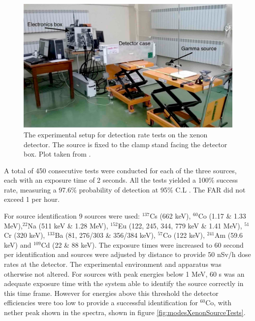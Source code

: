 \begin{figure}[htbp]
\begin{center}
\includegraphics[width=120mm]{Chapter8/figures/XenonRatesTestSetup.pdf}
\caption{The experimental setup for detection rate tests on the xenon detector. The source is fixed to the clamp stand facing the detector box. Plot taken from \cite{modesInternal}.}
\label{fig:modesXenonSetup}
\end{center}
\end{figure}

A total of 450 consecutive tests were conducted for each of the three sources, each with an exposure time of 2 seconds. All the tests yielded a 100\% success rate, measuring a 97.6\% probability of detection at 95\% C.L \cite{modesInternal}. The FAR did not exceed 1 per hour.

For source identification 9 sources were used: $^{137}$Cs (662 keV), $^{60}$Co (1.17 \& 1.33 MeV),$^{22}$Na (511 keV \& 1.28 MeV), $^{152}$Eu (122, 245, 344, 779 keV \& 1.41 MeV), $^{51}$Cr (320 keV), $^{133}$Ba (81, 276/303 \& 356/384 keV), $^{57}$Co (122 keV), $^{241}$Am (59.6 keV) and $^{109}$Cd (22 \& 88 keV). The exposure times were increased to 60 second per identification and sources were adjusted by distance to provide 50 nSv/h dose rates at the detector. The experimental environment and apparatus was otherwise not altered. For sources with peak energies below 1 MeV, 60 s was an adequate exposure time with the system able to identify the source correctly in this time frame. However for energies above this threshold the detector efficiencies were too low to provide a successful identification for $^{60}$Co, with nether peak shown in the spectra, shown in figure \ref{fig:modesXenonSourceTests}.

